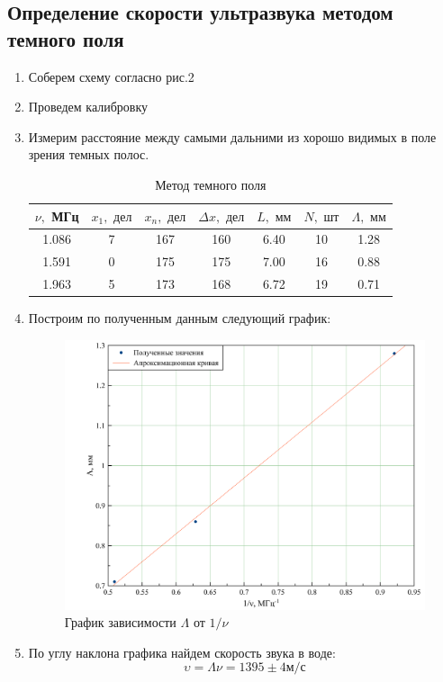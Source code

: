 \documentclass[a4paper, 12pt]{article}
\begin{document}
\subsection*{Определение скорости ультразвука методом темного поля}
\begin {enumerate}
\item Соберем схему согласно рис.2
\item Проведем калибровку
\item Измерим расстояние между самыми дальними из хорошо видимых в поле зрения темных полос.

\begin{table}[H]
	\centering
	\caption{Метод темного поля}
	\label{dark_pole}
	\begin{tabular}{c|c|c|c|c|c|c}
		
		$\nu,$ МГц & $x_1,\text{ дел}$ & $x_n,\text{ дел}$ & $\Delta x,\text{ дел}$ & $L,\text{ мм}$ & $N,\text{ шт}$ & $\Lambda,\text{ мм}$ \\ \toprule
		1.086     & 7                & 167              & 160                   & 6.40           & 10            & 1.28                \\ \midrule
		1.591     & 0                & 175              & 175                   & 7.00             & 16            & 0.88               \\ \midrule
		1.963     & 5                & 173              & 168                   & 6.72          & 19            & 0.71               \\ \bottomrule
	\end{tabular}
\end{table}
\item Построим по полученным данным следующий график:

    \begin {figure}[H]
		\begin{center}
			\includegraphics[width = 0.9 \textwidth]{graph3}
			\caption{График зависимости $\Lambda $ от $1/\nu$}
		\end{center}
	\end {figure}
	
\item По углу наклона графика найдем скорость звука в воде: 
$$\upsilon = \Lambda \nu = 1395\pm 4 \text{м/с}$$
\end {enumerate}
\end{document}
